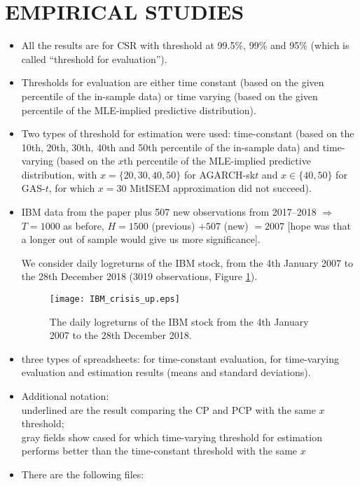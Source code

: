 \documentclass[a4paper,10pt]{article} %
\begin{document}
\clearpage

\section{EMPIRICAL STUDIES}
\begin{itemize}
\item All the results are for CSR with threshold at 99.5\%, 99\% and 95\% 
(which is called ``threshold for evaluation''). 
\item Thresholds for evaluation are either time constant (based on the given 
percentile of the in-sample data) or time varying (based on the given percentile of the MLE-implied predictive distribution).
\item Two  types of threshold for estimation were used: time-constant (based on the 10th, 20th, 30th, 40th and 50th percentile of the in-sample data) and time-varying (based on the $x$th percentile of the MLE-implied predictive distribution, with $x=\{20,30,40,50\}$ for AGARCH-sk$t$ and $x\in \{40,50\}$ for GAS-$t$, for which $x=30$ MitISEM approximation did not succeed).
\item IBM data from the paper plus 507 new observations from 2017--2018 $\Rightarrow$ $T = 1000$ as before, $H=1500$ (previous) $+ 507$ (new) $= 2007$ [hope was that a longer out of sample would give us more significance]. 

 We consider  daily  logreturns of the IBM stock, from the 4th January 2007 to the 28th December 2018 (3019 observations,  Figure \ref{fig:data_up}).
\begin{figure}[H]
\centering
\centering
\texttt{[image: IBM\_crisis\_up.eps]} 
\caption{The daily logreturns of the IBM stock  from the 4th January 2007 to the 28th December 2018.}
\label{fig:data_up}       
\end{figure}

\item three types of spreadsheets: for time-constant evaluation, for time-varying evaluation and estimation results (means and standard deviations).

\item Additional notation:\\
underlined are the result comparing the CP and PCP with the same $x$ threshold;\\
gray fields show cased for which time-varying threshold for estimation performs better than the time-constant threshold with the same $x$
\item There are the following files:


\end{itemize}
\end{document}

